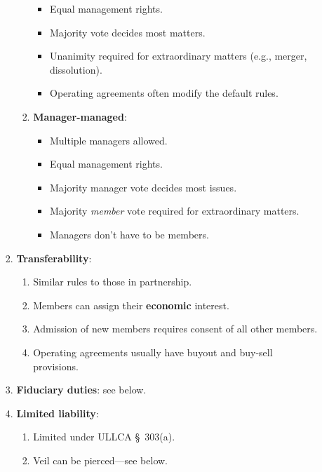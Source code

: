 \begin{enumerate}
\begin{enumerate}
\begin{enumerate}
\begin{enumerate}
\begin{itemize}
                    \item Equal management rights.
                    \item Majority vote decides most matters.
                    \item Unanimity required for extraordinary matters (e.g., 
                    merger, dissolution).
                    \item Operating agreements often modify the default rules.
                \end{itemize}
                \item \textbf{Manager-managed}:
                \begin{itemize}
                    \item Multiple managers allowed.
                    \item Equal management rights.
                    \item Majority manager vote decides most issues.
                    \item Majority \emph{member} vote required for 
                    extraordinary matters.
                    \item Managers don't have to be members.
                \end{itemize}
            \end{enumerate}
            \item \textbf{Transferability}:
            \begin{enumerate}
                \item Similar rules to those in partnership.
                \item Members can assign their \textbf{economic} interest. 
                \item Admission of new members requires consent of all other 
                members.
                \item Operating agreements usually have buyout and buy-sell 
                provisions.
            \end{enumerate}
            \item \textbf{Fiduciary duties}: see below.
            \item \textbf{Limited liability}:
            \begin{enumerate}
                \item Limited under ULLCA \S\ 303(a).
                \item Veil can be pierced---see below.
            \end{enumerate}

\end{enumerate}
\end{enumerate}
\end{enumerate}
